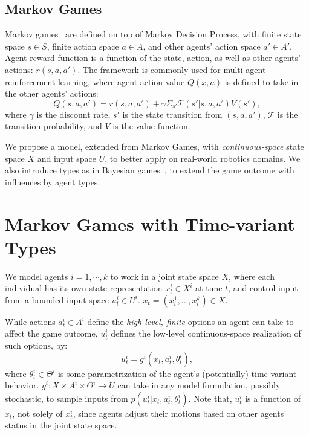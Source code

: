 \documentclass[letterpaper, 10 pt, conference]{ieeeconf}  %
\begin{document}
\subsection{Markov Games}
Markov games~\cite{littman1994markov} are defined on top of Markov Decision Process, with finite state space 
$s \in S$, finite action space $a \in A$, and other agents' action space 
$a' \in A'$.  Agent reward 
function is a function of the state, action, as well as other agents' actions: 
$r(s,a,a')$. The framework is commonly used for multi-agent reinforcement 
learning, where agent action value $Q(x,a)$ is defined to take in the other agents' actions:
\begin{equation}
  Q(s,a,a') = r(s,a,a') + \gamma \Sigma_{s'}\mathcal{T}(s'|s,a,a')V(s'),
\end{equation}
where $\gamma$ is the discount rate, $s'$ is the state transition from 
$(s,a,a')$, $\mathcal{T}$ is the transition probability, and $V$ is the value 
function.

We propose a model, extended from Markov Games, with \textit{continuous-space} 
state space $X$ and input space $U$, to better apply on real-world robotics 
domains. We also introduce types as in Bayesian 
games~\cite{armbruster1979bayesian}, to extend the game outcome with influences by agent types.
\section{Markov Games with Time-variant Types}
We model agents $i = 1,\cdots ,k$ to work in a joint state space $X$, where each individual has its own state 
representation $x_t^i \in X^i$ at time $t$, and control input from a bounded 
input space $u_t^i \in U^i$. $x_t = (x^1_t,\ldots,x^k_t) \in X$.

While actions $a_t^i \in A^i$ define the \textit{high-level, finite} options an 
agent can take to affect the game outcome, $u_t^i$ defines the low-level continuous-space
realization of such options, by:
\begin{equation}\label{eq:g_function}
  u_t^i = g^i(x_t, a^i_t, \theta^i_t),
\end{equation}
where $\theta^i_t \in \Theta^i$ is some parametrization of the agent's 
(potentially) time-variant behavior. 
$g^i:X \times A^i \times \Theta^i \rightarrow U$ can take in any model 
formulation, 
possibly stochastic, to sample inputs from $p(u_t^i|x_t,a^i_t,\theta_t^i)$. 
Note that, $u_t^i$ is a function of $x_t$, not solely of $x^i_t$, since agents 
adjust their motions based on other agents' status in the joint state space.
\end{document}
